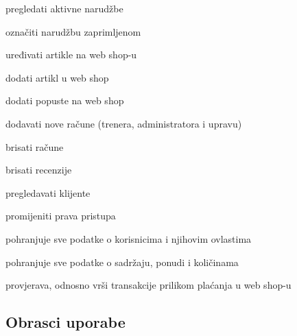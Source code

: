 \begin{packed_enum}
		\begin{packed_enum}
			
			\item pregledati aktivne narudžbe
			\item označiti narudžbu zaprimljenom
			\item uređivati artikle na web shop-u
			\item dodati artikl u web shop
			\item dodati popuste na web shop
			
		\end{packed_enum}
	
	\item  {}
	
	\begin{packed_enum}
		
		\item dodavati nove račune (trenera, administratora i upravu)
		\item brisati račune
		\item brisati recenzije
		\item pregledavati klijente
		\item promijeniti prava pristupa
	
	\end{packed_enum}
\item  {}

\begin{packed_enum}
	
	\item pohranjuje sve podatke o korisnicima i njihovim ovlastima
	\item pohranjuje sve podatke o sadržaju, ponudi i količinama

	
\end{packed_enum}
		\item  {}
		
		\begin{packed_enum}
			
			\item provjerava, odnosno vrši transakcije prilikom plaćanja u web shop-u
			
			
		\end{packed_enum}
			\end{packed_enum}
			
			\eject 
			
			
				
			\subsection{Obrasci uporabe}
				
